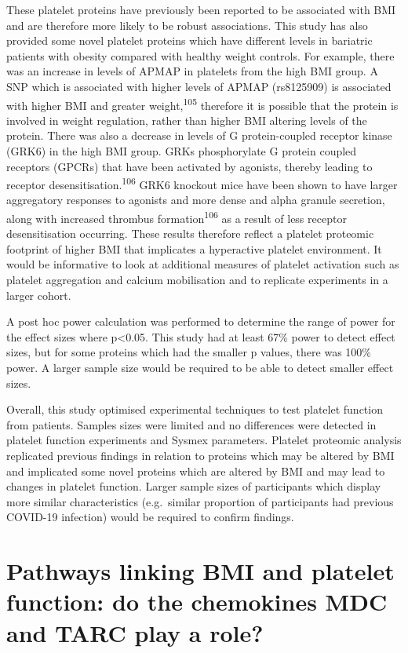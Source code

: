 \documentclass[11pt,twoside]{bristolthesis}
\begin{document}
These platelet proteins have previously been reported to be associated with BMI and are therefore more likely to be robust associations. This study has also provided some novel platelet proteins which have different levels in bariatric patients with obesity compared with healthy weight controls. For example, there was an increase in levels of APMAP in platelets from the high BMI group. A SNP which is associated with higher levels of APMAP (rs8125909) is associated with higher BMI and greater weight,\textsuperscript{105} therefore it is possible that the protein is involved in weight regulation, rather than higher BMI altering levels of the protein. There was also a decrease in levels of G protein-coupled receptor kinase (GRK6) in the high BMI group. GRKs phosphorylate G protein coupled receptors (GPCRs) that have been activated by agonists, thereby leading to receptor desensitisation.\textsuperscript{106} GRK6 knockout mice have been shown to have larger aggregatory responses to agonists and more dense and alpha granule secretion, along with increased thrombus formation\textsuperscript{106} as a result of less receptor desensitisation occurring. These results therefore reflect a platelet proteomic footprint of higher BMI that implicates a hyperactive platelet environment. It would be informative to look at additional measures of platelet activation such as platelet aggregation and calcium mobilisation and to replicate experiments in a larger cohort.

A post hoc power calculation was performed to determine the range of power for the effect sizes where p\textless0.05. This study had at least 67\% power to detect effect sizes, but for some proteins which had the smaller p values, there was 100\% power. A larger sample size would be required to be able to detect smaller effect sizes.

Overall, this study optimised experimental techniques to test platelet function from patients. Samples sizes were limited and no differences were detected in platelet function experiments and Sysmex parameters. Platelet proteomic analysis replicated previous findings in relation to proteins which may be altered by BMI and implicated some novel proteins which are altered by BMI and may lead to changes in platelet function. Larger sample sizes of participants which display more similar characteristics (e.g.~similar proportion of participants had previous COVID-19 infection) would be required to confirm findings.

\hypertarget{chemokine-platelets}{%
\chapter{Pathways linking BMI and platelet function: do the chemokines MDC and TARC play a role?}\label{chemokine-platelets}}
\end{document}
